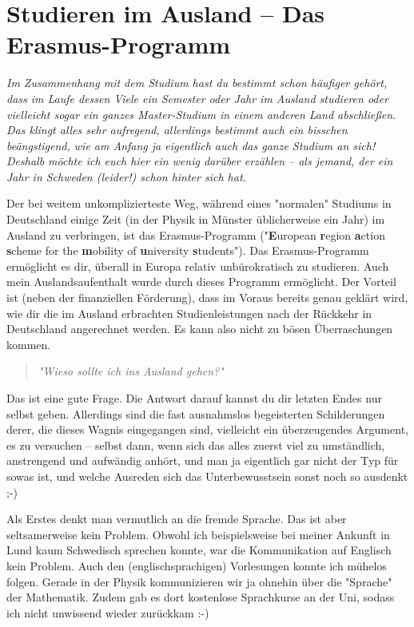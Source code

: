 \section{Studieren im Ausland – Das Erasmus-Programm}
\begin{multicols}{2}
\textit{Im Zusammenhang mit dem Studium hast du bestimmt schon häufiger gehört, dass im Laufe dessen Viele ein Semester oder Jahr im Ausland studieren oder vielleicht sogar ein ganzes Master-Studium in einem anderen Land abschließen.
Das klingt alles sehr aufregend, allerdings bestimmt auch ein bisschen beängstigend, wie am Anfang ja eigentlich auch das ganze Studium an sich!
Deshalb möchte ich euch hier ein wenig darüber erzählen – als jemand, der ein Jahr in Schweden (leider!) schon hinter sich hat.}

Der bei weitem unkomplizierteste Weg, während eines "normalen" Studiums in Deutschland einige Zeit (in der Physik in Münster üblicherweise ein Jahr) im Ausland zu verbringen, ist das Erasmus-Programm ("\textbf{E}uropean \textbf{r}egion \textbf{a}ction \textbf{s}cheme for the \textbf{m}obility of \textbf{u}niversity \textbf{s}tudents").
Das Erasmus-Programm ermöglicht es dir, überall in Europa relativ unbürokratisch zu studieren.
Auch mein Auslandsaufenthalt wurde durch dieses Programm ermöglicht.
Der Vorteil ist (neben der finanziellen Förderung), dass im Voraus bereits genau geklärt wird, wie dir die im Ausland erbrachten Studienleistungen nach der Rückkehr in Deutschland angerechnet werden.
Es kann also nicht zu bösen Überraschungen kommen.

\begin{quote}
	\textit{"Wieso sollte ich ins Ausland gehen?"}
\end{quote}
Das ist eine gute Frage.
Die Antwort darauf kannst du dir letzten Endes nur selbst geben.
Allerdings sind die fast ausnahmslos begeisterten Schilderungen derer, die dieses Wagnis eingegangen sind, vielleicht ein überzeugendes Argument, es zu versuchen – selbst dann, wenn sich das alles zuerst viel zu umständlich, anstrengend und aufwändig anhört, und man ja eigentlich gar nicht der Typ für sowas ist, und welche Ausreden sich das Unterbewusstsein sonst noch so ausdenkt ;-)

Als Erstes denkt man vermutlich an die fremde Sprache.
Das ist aber seltsamerweise kein Problem.
Obwohl ich beispielsweise bei meiner Ankunft in Lund kaum Schwedisch sprechen konnte, war die Kommunikation auf Englisch kein Problem.
Auch den (englischsprachigen) Vorlesungen konnte ich mühelos folgen.
Gerade in der Physik kommunizieren wir ja ohnehin über die "Sprache" der Mathematik.
Zudem gab es dort kostenlose Sprachkurse an der Uni, sodass ich nicht unwissend wieder zurückkam :-)


\end{multicols}
